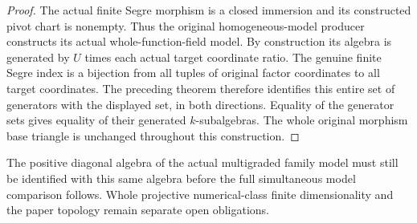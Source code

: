 \begin{proof}
The actual finite Segre morphism is a closed immersion and its constructed
pivot chart is nonempty. Thus the original homogeneous-model producer
constructs its actual whole-function-field model. By construction its
algebra is generated by $U$ times each actual target coordinate ratio.
The genuine finite Segre index is a bijection from all tuples of original
factor coordinates to all target coordinates. The preceding theorem
therefore identifies this entire set of generators with the displayed
set, in both directions. Equality of the generator sets gives equality
of their generated $k$-subalgebras. The whole original morphism base
triangle is unchanged throughout this construction.
\end{proof}
The positive diagonal algebra of the actual multigraded family model must
still be identified with this same algebra before the full simultaneous
model comparison follows. Whole projective numerical-class finite
dimensionality and the paper topology remain separate open obligations.
